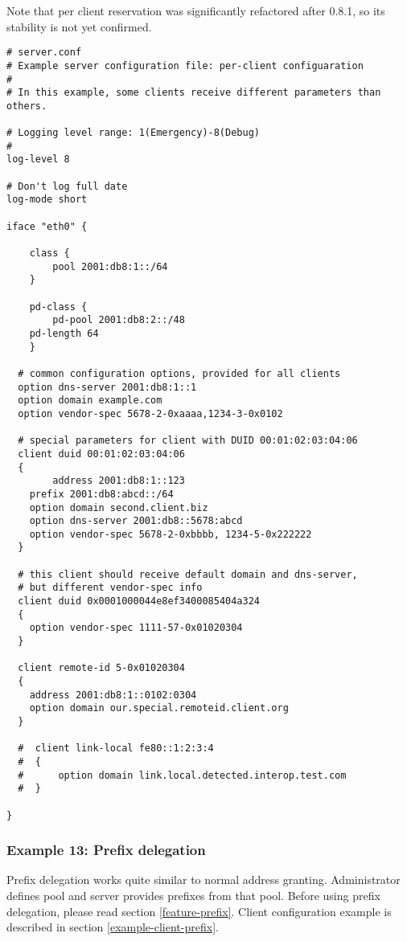 Note that per client reservation was significantly refactored after
0.8.1, so its stability is not yet confirmed.

\begin{lstlisting}
# server.conf
# Example server configuration file: per-client configuaration
#
# In this example, some clients receive different parameters than others.

# Logging level range: 1(Emergency)-8(Debug)
# 
log-level 8

# Don't log full date
log-mode short

iface "eth0" {

    class {
        pool 2001:db8:1::/64
    }

    pd-class {
        pd-pool 2001:db8:2::/48
	pd-length 64
    }

  # common configuration options, provided for all clients
  option dns-server 2001:db8:1::1
  option domain example.com
  option vendor-spec 5678-2-0xaaaa,1234-3-0x0102

  # special parameters for client with DUID 00:01:02:03:04:06      
  client duid 00:01:02:03:04:06
  {
        address 2001:db8:1::123
	prefix 2001:db8:abcd::/64
	option domain second.client.biz
	option dns-server 2001:db8::5678:abcd
	option vendor-spec 5678-2-0xbbbb, 1234-5-0x222222
  }

  # this client should receive default domain and dns-server, 
  # but different vendor-spec info
  client duid 0x0001000044e8ef3400085404a324
  {
	option vendor-spec 1111-57-0x01020304
  }
  
  client remote-id 5-0x01020304
  {
	address 2001:db8:1::0102:0304
	option domain our.special.remoteid.client.org
  }

  #  client link-local fe80::1:2:3:4
  #  {
  #      option domain link.local.detected.interop.test.com
  #  } 

}

\end{lstlisting}

\subsubsection{Example 13: Prefix delegation}
\label{example-server-prefix}

Prefix delegation works quite similar to normal address granting.
Administrator defines pool and server provides prefixes from that
pool. Before using prefix delegation, please read section
\ref{feature-prefix}. Client configuration example is described in section
\ref{example-client-prefix}.

